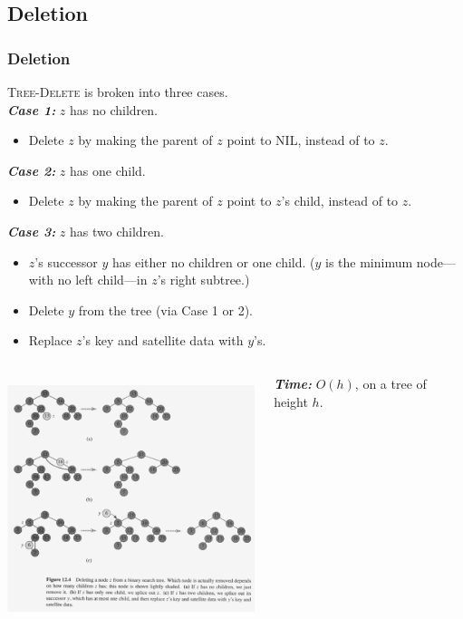\documentclass[notes,serif]{beamer}
\begin{document}
%

\subsection{Deletion}
\begin{frame}
  \frametitle{Deletion}
  \textsc{Tree-Delete} is broken into three cases. \\
  {\bf \em Case 1:} $z$ has no children.
  \begin{itemize}
    \item Delete $z$ by making the parent of $z$ point to NIL, instead of to $z$.
  \end{itemize}
  {\bf \em Case 2:} $z$ has one child.
  \begin{itemize}
    \item Delete $z$ by making the parent of $z$ point to $z$'s child, instead of to $z$.
  \end{itemize}
  {\bf \em Case 3:} $z$ has two children.
  \begin{itemize}
    \item $z$'s successor $y$ has either no children or one child. ($y$ is the minimum
node---with no left child---in $z$'s right subtree.)
    \item Delete $y$ from the tree (via Case 1 or 2).
    \item Replace $z$'s key and satellite data with $y$'s.
  \end{itemize}
\end{frame}

\begin{frame}
  \begin{columns}
  \begin{block}{}
    \includegraphics[height=7.2cm]{12-fig-tree_delete}
  \end{block}
  \begin{block}{}
    {\small {\bf\em Time:} $O(h)$, on a tree of height $h$.}
  \end{block}
  \end{columns}
\end{frame}
\end{document}

